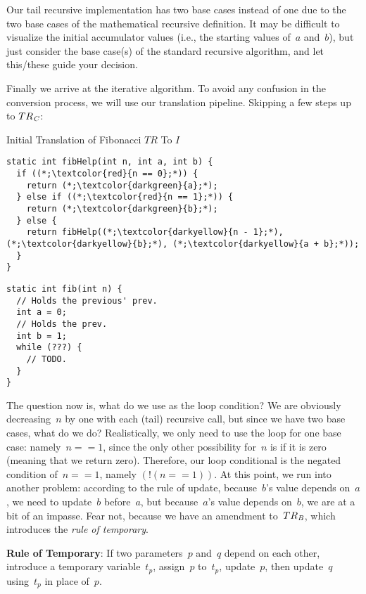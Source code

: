 Our tail recursive implementation has two base cases instead of one due to the two base cases of the mathematical recursive definition. 
It may be difficult to visualize the initial accumulator values (i.e., the starting values of~$a$ and~$b$), but just consider the base case(s) of the standard recursive algorithm, and let this/these guide your decision.

Finally we arrive at the iterative algorithm. 
To avoid any confusion in the conversion process, we will use our translation pipeline. 
Skipping a few steps up to $TR_\emph{C}$:

\begin{clrr}[]{Initial Translation of Fibonacci \emph{$TR$} To $I$}
\begin{lstlisting}[language=MyJavaNF]
static int fibHelp(int n, int a, int b) {
  if ((*;\textcolor{red}{n == 0};*)) {
    return (*;\textcolor{darkgreen}{a};*);
  } else if ((*;\textcolor{red}{n == 1};*)) {
    return (*;\textcolor{darkgreen}{b};*);
  } else {
    return fibHelp((*;\textcolor{darkyellow}{n - 1};*), (*;\textcolor{darkyellow}{b};*), (*;\textcolor{darkyellow}{a + b};*));
  }
}
\end{lstlisting}
\tcblower
\begin{lstlisting}[language=MyJavaNF]
static int fib(int n) {
  // Holds the previous' prev.
  int a = 0;
  // Holds the prev.
  int b = 1;
  while (???) {
    // TODO.
  }
}
\end{lstlisting}
\end{clrr}

The question now is, what do we use as the  loop condition? 
We are obviously decreasing~$n$ by one with each (tail) recursive call, but since we have two base cases, what do we do? 
Realistically, we only need to use the loop for one base case: namely~$n == 1$, since the only other possibility for~$n$ is if it is zero (meaning that we return zero). 
Therefore, our loop conditional is the negated condition of~$n == 1$, namely $(!(n == 1))$. 
At this point, we run into another problem: according to the rule of update, because~$b$'s value depends on~$a$, we need to update~$b$ before~$a$, but because~$a$'s value depends on~$b$, we are at a bit of an impasse. 
Fear not, because we have an amendment to~$TR_\emph{B}$, which introduces the \emph{rule of temporary}.

\textbf{Rule of Temporary}: If two parameters~$p$ and~$q$ depend on each other, introduce a temporary variable~$t_p$, assign~$p$ to~$t_p$, update~$p$, then update~$q$ using~$t_p$ in place of~$p$.

